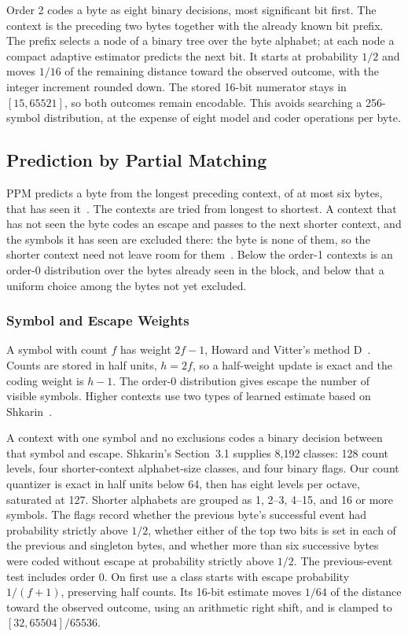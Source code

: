 \documentclass[10pt,letterpaper]{article}
\begin{document}
Order 2 codes a byte as eight binary decisions, most significant bit first. The context is the preceding two bytes together with the already known bit prefix. The prefix selects a node of a binary tree over the byte alphabet; at each node a compact adaptive estimator predicts the next bit. It starts at probability $1/2$ and moves $1/16$ of the remaining distance toward the observed outcome, with the integer increment rounded down. The stored 16-bit numerator stays in $[15,65521]$, so both outcomes remain encodable. This avoids searching a 256-symbol distribution, at the expense of eight model and coder operations per byte.

\subsection{Prediction by Partial Matching}
PPM predicts a byte from the longest preceding context, of at most six bytes, that has seen it~\cite{cleary}. The contexts are tried from longest to shortest. A context that has not seen the byte codes an escape and passes to the next shorter context, and the symbols it has seen are excluded there: the byte is none of them, so the shorter context need not leave room for them~\cite{moffatppm}. Below the order-1 contexts is an order-0 distribution over the bytes already seen in the block, and below that a uniform choice among the bytes not yet excluded.

\subsubsection{Symbol and Escape Weights}
A symbol with count $f$ has weight $2f-1$, Howard and Vitter's method D~\cite{howard}. Counts are stored in half units, $h=2f$, so a half-weight update is exact and the coding weight is $h-1$. The order-0 distribution gives escape the number of visible symbols. Higher contexts use two types of learned estimate based on Shkarin~\cite{shkarin}.

A context with one symbol and no exclusions codes a binary decision between that symbol and escape. Shkarin's Section~3.1 supplies 8,192 classes: 128 count levels, four shorter-context alphabet-size classes, and four binary flags. Our count quantizer is exact in half units below 64, then has eight levels per octave, saturated at 127. Shorter alphabets are grouped as 1, 2--3, 4--15, and 16 or more symbols. The flags record whether the previous byte's successful event had probability strictly above $1/2$, whether either of the top two bits is set in each of the previous and singleton bytes, and whether more than six successive bytes were coded without escape at probability strictly above $1/2$. The previous-event test includes order 0. On first use a class starts with escape probability $1/(f+1)$, preserving half counts. Its 16-bit estimate moves $1/64$ of the distance toward the observed outcome, using an arithmetic right shift, and is clamped to $[32,65504]/65536$.
\end{document}
